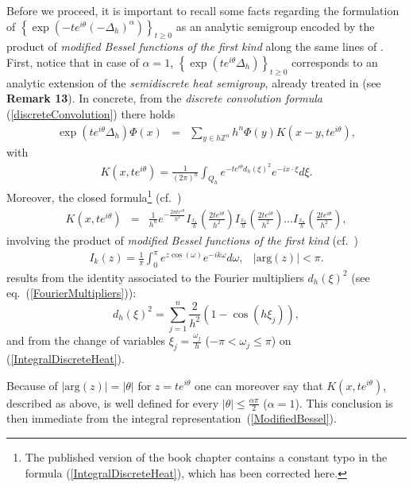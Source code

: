 \documentclass{elsarticle}
\newcommand{\BZ}{{\mathbb Z}}
\begin{document}
Before we proceed, it is important to recall some facts regarding the formulation of $\left\{\exp(-te^{i\theta}(-\Delta_h)^\alpha)\right\}_{t\geq 0}$ as an analytic semigroup encoded by the product of {\it modified Bessel functions of the first kind} along the same lines of \cite[Subsection 21.4.2]{F19}.
First, notice that in case of $\alpha=1$, $\left\{\exp\left(te^{i\theta}\Delta_h\right)\right\}_{t\geq 0}$ corresponds to an analytic extension of the {\it semidiscrete heat semigroup}, already treated in \cite[Section 6]{LizamaRoncal18} (see {\bf Remark 13}). In concrete, from the \textit{discrete 
	convolution formula} (\ref{discreteConvolution})
there holds
\begin{eqnarray}
	\label{discreteConvolutionHeat}\exp\left(te^{i\theta}\Delta_h\right)\Phi(x)&=&\sum_{y \in h\BZ^n}  h^n\Phi(y)K(x-y,te^{i\theta}),
\end{eqnarray}
with 
\begin{eqnarray}
	\label{IntegralDiscreteHeat}K(x,te^{i\theta})=\frac{1}{(2\pi)^{n}} \int_{Q_h} e^{-te^{i\theta}d_h(\xi)^2} e^{-i x \cdot \xi} d\xi.
\end{eqnarray}
Moreover, the closed formula\footnote{The published version of the book chapter \cite{F19} contains a constant typo in the formula (\ref{IntegralDiscreteHeat}), which has been corrected here.} (cf.~\cite[p. 458, eq.~(21.35)]{F19})
\begin{eqnarray*}
	\label{ClosedFormulaBessel} K(x,te^{i\theta})&=&\frac{1}{h^{n}}e^{-\frac{2nte^{i\theta}}{h^2}} I_{\frac{x_1}{h}}\left(\frac{2te^{i\theta}}{h^2}\right)I_{\frac{x_2}{h}}\left(\frac{2te^{i\theta}}{h^2}\right) \ldots I_{\frac{x_n}{h}}\left(\frac{2te^{i\theta}}{h^2}\right),
\end{eqnarray*}
involving the product of {\it modified Bessel functions of the first kind} (cf.~\cite[p. 456, 2.5.40 (3)]{PBM86})
\begin{eqnarray}
	\label{ModifiedBessel}I_k(z)=\frac{1}{\pi}\int_{0}^\pi e^{z\cos(\omega)}e^{-ik\omega}d\omega, & |\mbox{arg}(z)|<\pi.
\end{eqnarray}
results from the identity associated to the Fourier multipliers $d_h(\xi)^2$ (see eq.~(\ref{FourierMultipliers})):
$$ 
d_h(\xi)^2=\sum_{j=1}^n \frac{2}{h^2}\left(1-\cos(h\xi_j)\right),
$$
and from the change of variables $\xi_j=\frac{\omega_j}{h}$ ($-\pi <\omega_j\leq \pi$) on (\ref{IntegralDiscreteHeat}).

Because of $|\mbox{arg}(z)|=|\theta|$ for $z=te^{i\theta}$ one can moreover say that $K(x,te^{i\theta})$, described as above, is well defined for every $|\theta|\leq \frac{\alpha \pi}{2}$ ($\alpha=1$). This conclusion is then immediate from the integral representation~(\ref{ModifiedBessel}).
\end{document}
